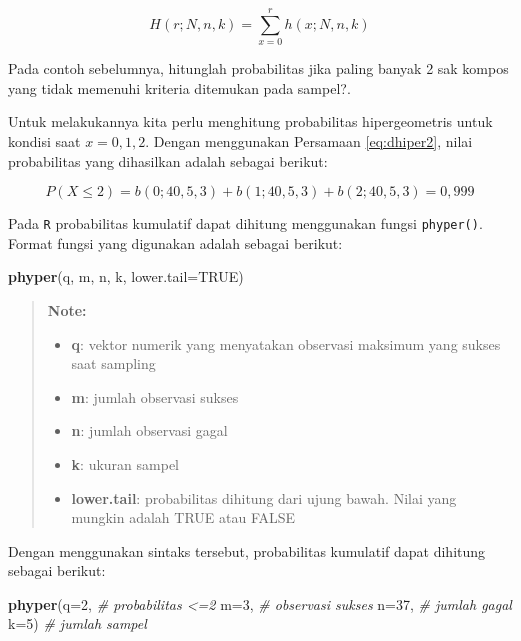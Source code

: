 \documentclass[]{book}
\newenvironment{Shaded}{\begin{snugshade}}{\end{snugshade}}
\newcommand{\KeywordTok}[1]{\textcolor[rgb]{0.13,0.29,0.53}{\textbf{#1}}}
\newcommand{\DataTypeTok}[1]{\textcolor[rgb]{0.13,0.29,0.53}{#1}}
\newcommand{\DecValTok}[1]{\textcolor[rgb]{0.00,0.00,0.81}{#1}}
\newcommand{\CommentTok}[1]{\textcolor[rgb]{0.56,0.35,0.01}{\textit{#1}}}
\newcommand{\OtherTok}[1]{\textcolor[rgb]{0.56,0.35,0.01}{#1}}
\newcommand{\NormalTok}[1]{#1}
\providecommand{\tightlist}{%
  \setlength{\itemsep}{0pt}\setlength{\parskip}{0pt}}
\begin{document}
\begin{equation}
   H\left(r;N,n,k\right)=\sum_{x=0}^rh\left(x;N,n,k\right)
  \label{eq:dhiper2}
\end{equation}

Pada contoh sebelumnya, hitunglah probabilitas jika paling banyak 2 sak
kompos yang tidak memenuhi kriteria ditemukan pada sampel?.

Untuk melakukannya kita perlu menghitung probabilitas hipergeometris
untuk kondisi saat \(x=0,1,2\). Dengan menggunakan Persamaan
\eqref{eq:dhiper2}, nilai probabilitas yang dihasilkan adalah sebagai
berikut:

\[
P\left(X\le2\right)=b\left(0;40,5,3\right)+b\left(1;40,5,3\right)+b\left(2;40,5,3\right)=0,999
\]

Pada \texttt{R} probabilitas kumulatif dapat dihitung menggunakan fungsi
\texttt{phyper()}. Format fungsi yang digunakan adalah sebagai berikut:

\begin{Shaded}
\begin{Highlighting}[]
\KeywordTok{phyper}\NormalTok{(q, m, n, k, }\DataTypeTok{lower.tail=}\OtherTok{TRUE}\NormalTok{)}
\end{Highlighting}
\end{Shaded}

\begin{quote}
\textbf{Note: }

\begin{itemize}
\tightlist
\item
  \textbf{q}: vektor numerik yang menyatakan observasi maksimum yang
  sukses saat sampling
\item
  \textbf{m}: jumlah observasi sukses
\item
  \textbf{n}: jumlah observasi gagal
\item
  \textbf{k}: ukuran sampel
\item
  \textbf{lower.tail}: probabilitas dihitung dari ujung bawah. Nilai
  yang mungkin adalah TRUE atau FALSE
\end{itemize}
\end{quote}

Dengan menggunakan sintaks tersebut, probabilitas kumulatif dapat
dihitung sebagai berikut:

\begin{Shaded}
\begin{Highlighting}[]
\KeywordTok{phyper}\NormalTok{(}\DataTypeTok{q=}\DecValTok{2}\NormalTok{, }\CommentTok{# probabilitas <=2}
       \DataTypeTok{m=}\DecValTok{3}\NormalTok{, }\CommentTok{# observasi sukses}
       \DataTypeTok{n=}\DecValTok{37}\NormalTok{, }\CommentTok{# jumlah gagal}
       \DataTypeTok{k=}\DecValTok{5}\NormalTok{) }\CommentTok{# jumlah sampel}
\end{Highlighting}
\end{Shaded}
\end{document}
